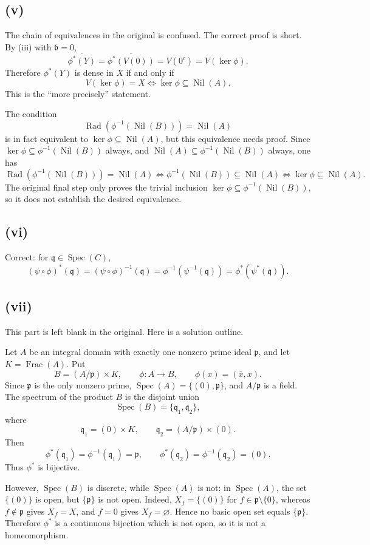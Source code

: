 \documentclass[11pt]{article}
\DeclareMathOperator{\Spec}{Spec}
\DeclareMathOperator{\Rad}{Rad}
\DeclareMathOperator{\Nil}{Nil}
\DeclareMathOperator{\Frac}{Frac}
\newcommand{\fp}{\mathfrak p}
\newcommand{\fb}{\mathfrak b}
\newcommand{\fq}{\mathfrak q}
\begin{document}
\subsection*{(v)}
The chain of equivalences in the original is confused.  The correct proof is
short.  By (iii) with \(\fb=0\),
\[
\overline{\phi^*(Y)}
=\overline{\phi^*(V(0))}
=V(0^c)
=V(\ker\phi).
\]
Therefore \(\phi^*(Y)\) is dense in \(X\) if and only if
\[
V(\ker\phi)=X
\iff \ker\phi\subseteq\Nil(A).
\]
This is the ``more precisely'' statement.

The condition
\[
\Rad(\phi^{-1}(\Nil(B)))=\Nil(A)
\]
is in fact equivalent to \(\ker\phi\subseteq\Nil(A)\), but this equivalence
needs proof.  Since
\(\ker\phi\subseteq\phi^{-1}(\Nil(B))\) always, and
\(\Nil(A)\subseteq\phi^{-1}(\Nil(B))\) always, one has
\[
\Rad(\phi^{-1}(\Nil(B)))=\Nil(A)
\iff \phi^{-1}(\Nil(B))\subseteq\Nil(A)
\iff \ker\phi\subseteq\Nil(A).
\]
The original final step only proves the trivial inclusion
\(\ker\phi\subseteq\phi^{-1}(\Nil(B))\), so it does not establish the
desired equivalence.

\subsection*{(vi)}
Correct: for \(\fq\in\Spec(C)\),
\[
(\psi\circ\phi)^*(\fq)
=(\psi\circ\phi)^{-1}(\fq)
=\phi^{-1}(\psi^{-1}(\fq))
=\phi^*(\psi^*(\fq)).
\]

\subsection*{(vii)}
This part is left blank in the original.  Here is a solution outline.

Let \(A\) be an integral domain with exactly one nonzero prime ideal \(\fp\),
and let \(K=\Frac(A)\).  Put
\[
B=(A/\fp)\times K,\qquad \phi:A\longrightarrow B,\qquad
\phi(x)=(\bar x,x).
\]
Since \(\fp\) is the only nonzero prime, \(\Spec(A)=\{(0),\fp\}\), and
\(A/\fp\) is a field.  The spectrum of the product \(B\) is the disjoint union
\[
\Spec(B)=\{\fq_1,\fq_2\},
\]
where
\[
\fq_1=(0)\times K,\qquad \fq_2=(A/\fp)\times(0).
\]
Then
\[
\phi^*(\fq_1)=\phi^{-1}(\fq_1)=\fp,\qquad
\phi^*(\fq_2)=\phi^{-1}(\fq_2)=(0).
\]
Thus \(\phi^*\) is bijective.

However, \(\Spec(B)\) is discrete, while \(\Spec(A)\) is not: in
\(\Spec(A)\), the set \(\{(0)\}\) is open, but \(\{\fp\}\) is not open.
Indeed, \(X_f=\{(0)\}\) for \(f\in\fp\setminus\{0\}\), whereas \(f\notin\fp\)
gives \(X_f=X\), and \(f=0\) gives \(X_f=\varnothing\).  Hence no basic open
set equals \(\{\fp\}\).  Therefore \(\phi^*\) is a continuous bijection which
is not open, so it is not a homeomorphism.
\end{document}
